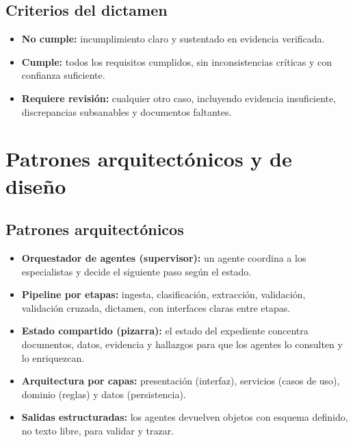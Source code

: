 \documentclass[11pt, a4paper]{article}
\begin{document}
\subsection*{Criterios del dictamen}
\begin{itemize}
    \item \textbf{No cumple:} incumplimiento claro y sustentado en evidencia verificada.
    \item \textbf{Cumple:} todos los requisitos cumplidos, sin inconsistencias críticas y con confianza suficiente.
    \item \textbf{Requiere revisión:} cualquier otro caso, incluyendo evidencia insuficiente, discrepancias subsanables y documentos faltantes.
\end{itemize}

\section{Patrones arquitectónicos y de diseño}

\subsection*{Patrones arquitectónicos}
\begin{itemize}
    \item \textbf{Orquestador de agentes (supervisor):} un agente coordina a los especialistas y decide el siguiente paso según el estado.
    \item \textbf{Pipeline por etapas:} ingesta, clasificación, extracción, validación, validación cruzada, dictamen, con interfaces claras entre etapas.
    \item \textbf{Estado compartido (pizarra):} el estado del expediente concentra documentos, datos, evidencia y hallazgos para que los agentes lo consulten y lo enriquezcan.
    \item \textbf{Arquitectura por capas:} presentación (interfaz), servicios (casos de uso), dominio (reglas) y datos (persistencia).
    \item \textbf{Salidas estructuradas:} los agentes devuelven objetos con esquema definido, no texto libre, para validar y trazar.
\end{itemize}
\end{document}
